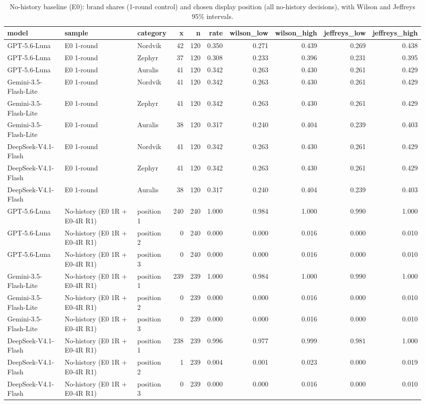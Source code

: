 \begin{table}[htbp]
\centering
\scriptsize
\caption{No-history baseline (E0): brand shares (1-round control) and chosen display position (all no-history decisions), with Wilson and Jeffreys 95\% intervals.}
\label{tab:tab02_e0_brand_position_shares}
\begin{tabular}{lllrrrrrrr}
\toprule
model & sample & category & x & n & rate & wilson\_low & wilson\_high & jeffreys\_low & jeffreys\_high \\
\midrule
GPT-5.6-Luna & E0 1-round & Nordvik & 42 & 120 & 0.350 & 0.271 & 0.439 & 0.269 & 0.438 \\
GPT-5.6-Luna & E0 1-round & Zephyr & 37 & 120 & 0.308 & 0.233 & 0.396 & 0.231 & 0.395 \\
GPT-5.6-Luna & E0 1-round & Auralis & 41 & 120 & 0.342 & 0.263 & 0.430 & 0.261 & 0.429 \\
Gemini-3.5-Flash-Lite & E0 1-round & Nordvik & 41 & 120 & 0.342 & 0.263 & 0.430 & 0.261 & 0.429 \\
Gemini-3.5-Flash-Lite & E0 1-round & Zephyr & 41 & 120 & 0.342 & 0.263 & 0.430 & 0.261 & 0.429 \\
Gemini-3.5-Flash-Lite & E0 1-round & Auralis & 38 & 120 & 0.317 & 0.240 & 0.404 & 0.239 & 0.403 \\
DeepSeek-V4.1-Flash & E0 1-round & Nordvik & 41 & 120 & 0.342 & 0.263 & 0.430 & 0.261 & 0.429 \\
DeepSeek-V4.1-Flash & E0 1-round & Zephyr & 41 & 120 & 0.342 & 0.263 & 0.430 & 0.261 & 0.429 \\
DeepSeek-V4.1-Flash & E0 1-round & Auralis & 38 & 120 & 0.317 & 0.240 & 0.404 & 0.239 & 0.403 \\
GPT-5.6-Luna & No-history (E0 1R + E0-4R R1) & position 1 & 240 & 240 & 1.000 & 0.984 & 1.000 & 0.990 & 1.000 \\
GPT-5.6-Luna & No-history (E0 1R + E0-4R R1) & position 2 & 0 & 240 & 0.000 & 0.000 & 0.016 & 0.000 & 0.010 \\
GPT-5.6-Luna & No-history (E0 1R + E0-4R R1) & position 3 & 0 & 240 & 0.000 & 0.000 & 0.016 & 0.000 & 0.010 \\
Gemini-3.5-Flash-Lite & No-history (E0 1R + E0-4R R1) & position 1 & 239 & 239 & 1.000 & 0.984 & 1.000 & 0.990 & 1.000 \\
Gemini-3.5-Flash-Lite & No-history (E0 1R + E0-4R R1) & position 2 & 0 & 239 & 0.000 & 0.000 & 0.016 & 0.000 & 0.010 \\
Gemini-3.5-Flash-Lite & No-history (E0 1R + E0-4R R1) & position 3 & 0 & 239 & 0.000 & 0.000 & 0.016 & 0.000 & 0.010 \\
DeepSeek-V4.1-Flash & No-history (E0 1R + E0-4R R1) & position 1 & 238 & 239 & 0.996 & 0.977 & 0.999 & 0.981 & 1.000 \\
DeepSeek-V4.1-Flash & No-history (E0 1R + E0-4R R1) & position 2 & 1 & 239 & 0.004 & 0.001 & 0.023 & 0.000 & 0.019 \\
DeepSeek-V4.1-Flash & No-history (E0 1R + E0-4R R1) & position 3 & 0 & 239 & 0.000 & 0.000 & 0.016 & 0.000 & 0.010 \\
\bottomrule
\end{tabular}
\end{table}